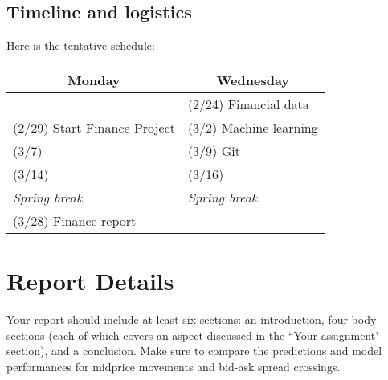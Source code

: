 \documentclass[11pt, oneside]{article}   	%
\begin{document}
\subsection*{Timeline and logistics}

Here is the tentative schedule:

\begin{table}[h]
\centering
\begin{tabular}{@{}l|l@{}}
\toprule
\multicolumn{1}{c|}{Monday} & \multicolumn{1}{c}{Wednesday} \\
\hline
                               & (2/24) Financial data \\
(2/29) Start Finance Project   & (3/2) Machine learning \\
(3/7)                          & (3/9) Git \\
(3/14)                         & (3/16) \\
\emph{\hspace{12mm} Spring break}  & \emph{\hspace{12mm} Spring break}\\
(3/28) Finance report          & \\
\bottomrule
\end{tabular}
\end{table}


\section{Report Details}
Your report should include at least six sections: an introduction, four body sections (each of which covers an aspect discussed in the ``Your assignment" section), and a conclusion. Make sure to compare the predictions and model performances for midprice movements and bid-ask spread crossings.



\end{document}
